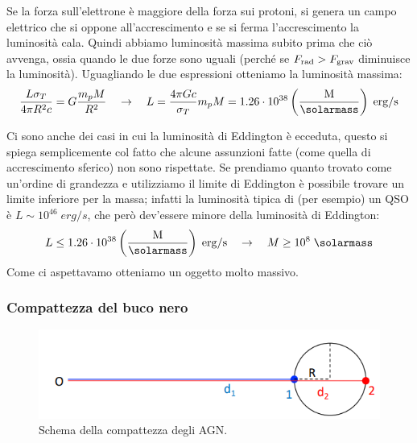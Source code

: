 Se la forza sull’elettrone è maggiore della forza sui protoni, si genera un campo elettrico che si oppone all’accrescimento e se si ferma l’accrescimento la luminosità cala. Quindi abbiamo luminosità massima subito prima che ciò avvenga, ossia quando le due forze sono uguali (perché se $F_\textup{rad} > F_\textup{grav}$ diminuisce la luminosità). Uguagliando le due espressioni otteniamo la luminosità massima:
\begin{equation*}
    \frac{L\sigma_T}{4\pi R^2 c} =  G\frac{m_pM}{R^2} \quad \rightarrow \quad L = \frac{4\pi G c}{\sigma_T}m_pM = 1.26\cdot 10^{38} \left(\frac{\textup{M}}{\si{\solarmass}}\right)\;\si{erg}/\si{s}
\end{equation*}

Ci sono anche dei casi in cui la luminosità di Eddington è ecceduta, questo si spiega semplicemente col fatto che alcune assunzioni fatte (come quella di accrescimento sferico) non sono rispettate. Se prendiamo quanto trovato come un'ordine di grandezza e utilizziamo il limite di Eddington è possibile trovare un limite inferiore per la massa; infatti la luminosità tipica di (per esempio) un QSO è $L\sim 10^{46} \;\si{erg}/\si{s}$, che però dev'essere minore della luminosità di Eddington:
\begin{equation*}
    L \leq 1.26\cdot 10^{38} \left(\frac{\textup{M}}{\si{\solarmass}}\right)\;\si{erg}/\si{s} \quad \rightarrow \quad M \geq 10^8 \;\si{\solarmass}
\end{equation*}
Come ci aspettavamo otteniamo un oggetto molto massivo. 

\subsubsection{Compattezza del buco nero}

\begin{figure}
    \centering
    \includegraphics[width = 0.7 \textwidth]{immagini/compattezza-agn.png}
    \caption{Schema della compattezza degli AGN.}
    \label{fig:compattezza-agn}
\end{figure}

